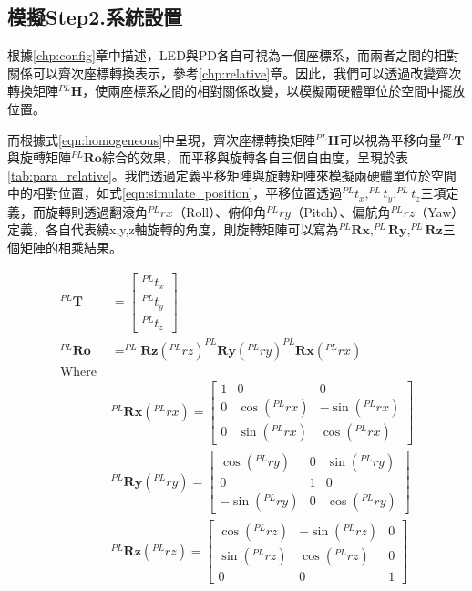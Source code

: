     

\subsection{模擬Step2.系統設置}
\label{chp:simulate_position}



根據\ref{chp:config}章中描述，LED與PD各自可視為一個座標系，而兩者之間的相對關係可以齊次座標轉換表示，參考\ref{chp:relative}章。因此，我們可以透過改變齊次轉換矩陣$^{PL}\boldsymbol{H}$，使兩座標系之間的相對關係改變，以模擬兩硬體單位於空間中擺放位置。

而根據式\ref{eqn:homogeneous}中呈現，齊次座標轉換矩陣$^{PL}\boldsymbol{H}$可以視為平移向量$^{PL}\boldsymbol{T}$與旋轉矩陣$^{PL}\boldsymbol{Ro}$綜合的效果，而平移與旋轉各自三個自由度，呈現於表\ref{tab:para_relative}。我們透過定義平移矩陣與旋轉矩陣來模擬兩硬體單位於空間中的相對位置，如式\ref{eqn:simulate_position}，平移位置透過$^{PL}t_x,^{PL}t_y,^{PL}t_z$三項定義，而旋轉則透過翻滾角$^{PL}rx$（Roll）、俯仰角$^{PL}ry$（Pitch）、偏航角$^{PL}rz$（Yaw）定義，各自代表繞x,y,z軸旋轉的角度，則旋轉矩陣可以寫為$^{PL}\boldsymbol{Rx},^{PL}\boldsymbol{Ry},^{PL}\boldsymbol{Rz}$三個矩陣的相乘結果。

\begin{equation}
    \label{eqn:simulate_position}
    \begin{aligned}
    ^{PL}\boldsymbol{T} &= 
    \left[\begin{array}{c}
        ^{PL}t_x \\^{PL}t_y\\^{PL}t_z
    \end{array}\right]\\
    ^{PL}\boldsymbol{Ro} &= 
    ^{PL}\boldsymbol{Rz} (^{PL}rz)^{PL}\boldsymbol{Ry}(^{PL}ry) ^{PL}\boldsymbol{Rx} (^{PL}rx)\\
    \text{Where }&\\
    &^{PL}\boldsymbol{Rx} (^{PL}rx) =
    \left[ \begin{array}{ccc}
        1&0&0\\
        0&\cos (^{PL}rx) &-\sin (^{PL}rx) \\
        0&\sin (^{PL}rx) &\cos (^{PL}rx) 
    \end{array}\right] \\
    &^{PL}\boldsymbol{Ry}(^{PL}ry)=
    \left[ \begin{array}{ccc}
        \cos (^{PL}ry) &0&\sin (^{PL}ry) \\
        0&1&0\\
        -\sin (^{PL}ry) &0&\cos (^{PL}ry)
    \end{array}\right]\\
    &^{PL}\boldsymbol{Rz} (^{PL}rz) = 
    \left[ \begin{array}{ccc}
        \cos (^{PL}rz) &-\sin (^{PL}rz)& 0 \\
        \sin (^{PL}rz) &\cos (^{PL}rz)& 0 \\
        0 &0&1
    \end{array}\right]\\
    \end{aligned}
\end{equation}

